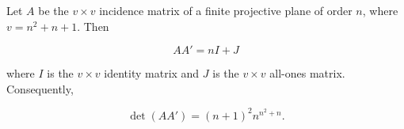 Let $A$ be the $v \times v$ incidence matrix of a finite projective plane of order $n$, where $v = n^2 + n + 1$. Then

$$AA' = nI + J$$

where $I$ is the $v \times v$ identity matrix and $J$ is the $v \times v$ all-ones matrix. Consequently,

$$\det(AA') = (n+1)^2 n^{n^2 + n}.$$
